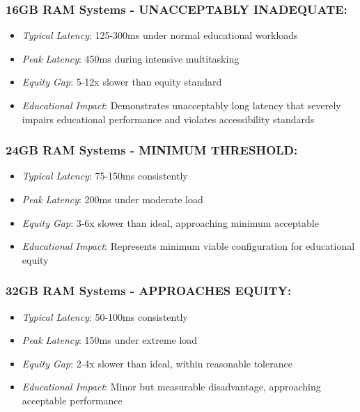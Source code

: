 \subsubsection{16GB RAM Systems - UNACCEPTABLY INADEQUATE:}

\begin{itemize}
\item \emph{Typical Latency}: 125-300ms under normal educational workloads
\item \emph{Peak Latency}: 450ms during intensive multitasking
\item \emph{Equity Gap}: 5-12x slower than equity standard
\item \emph{Educational Impact}: Demonstrates unacceptably long latency that severely impairs educational performance and violates accessibility standards
\end{itemize}

\subsubsection{24GB RAM Systems - MINIMUM THRESHOLD:}

\begin{itemize}
\item \emph{Typical Latency}: 75-150ms consistently
\item \emph{Peak Latency}: 200ms under moderate load
\item \emph{Equity Gap}: 3-6x slower than ideal, approaching minimum acceptable
\item \emph{Educational Impact}: Represents minimum viable configuration for educational equity
\end{itemize}

\subsubsection{32GB RAM Systems - APPROACHES EQUITY:}

\begin{itemize}
\item \emph{Typical Latency}: 50-100ms consistently
\item \emph{Peak Latency}: 150ms under extreme load
\item \emph{Equity Gap}: 2-4x slower than ideal, within reasonable tolerance
\item \emph{Educational Impact}: Minor but measurable disadvantage, approaching acceptable performance
\end{itemize}

